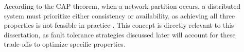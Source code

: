 According to the CAP theorem, when a network partition occurs, a distributed system must prioritize either consistency or availability, as achieving all three properties is not feasible in practice \cite{Tanenbaum2023, ibm-cap-theorem, Vitillo2021}. This concept is directly relevant to this dissertation, as fault tolerance strategies discussed later will account for these trade-offs to optimize specific properties.

\begin{comment}

\subsection{Evolution of distributed systems}

Distributed systems have been a significant area of research in computer science. The journey began with early client-server models in mainframe computing, which allowed virtualization to increase efficiency, which is an popular approach still in use today \cite{Lindsay2021}. This was followed by the development of cluster computing, offering affordable ways to boost computing power without relying on costly mainframes \cite{Lindsay2021, Gill2024}. During this phase, the Internet and the \gls{WWW} were created, marking an important point in history \cite{Lindsay2021}.

Subsequently, \gls{P2P} systems emerged, decentralizing computing through cooperative and distributed processes. With the rise of cloud computing, mobile computing, and the \gls{IoT} reached new levels of scalability, flexibility, and accessibility \cite{Gill2024}. Another design that emerged is micro-services architecture, which shares many properties with distributed systems and is widely used on the industry \cite{Adbelfattah2023}. Today, cutting-edge advancements focus on the following paradigms \cite{Gill2024}:

\begin{itemize}
	\item \textbf{Edge Computing:} Extends computing resources closer to data sources and end users, reducing latency and improving performance in real-time applications. This approach is critical for \gls{IoT} and applications where immediacy is essential \cite{Cao2020, Lindsay2021, Gill2024}.
	\item \textbf{Fog Computing:} Provides a layer of computing power between the cloud and edge devices, enhancing processing capabilities closer to the data source \cite{Cao2020, Lindsay2021, Gill2024}.
	\item \textbf{Dew Computing:} Complements cloud, edge, and fog computing by enabling local devices to perform data processing even when disconnected from centralized resources, enhancing resilience and accessibility for remote or offline scenarios \cite{Gusev2021, Gill2024}.
	\item \textbf{Serverless Computing:} Enables developers to execute code without managing underlying servers, automatically scaling resources based on demand. This model reduces operational overhead and allows efficient, event-driven architectures \cite{Yongkang2023, Gill2024}.
\end{itemize}
\end{comment}
